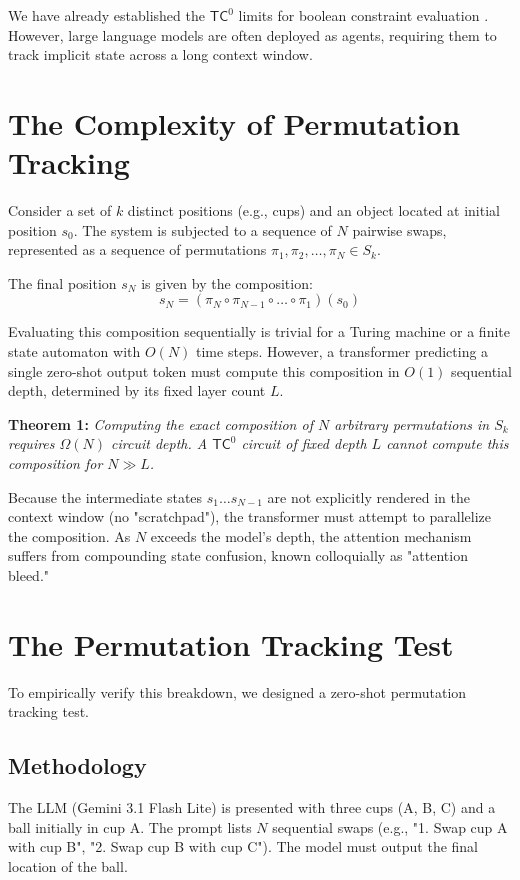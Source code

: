 \documentclass[12pt,a4paper]{article}
\begin{document}
We have already established the $\mathsf{TC}^0$ limits for boolean constraint evaluation \citep{aaronson2026_bounded}. However, large language models are often deployed as agents, requiring them to track implicit state across a long context window.

\section{The Complexity of Permutation Tracking}

Consider a set of $k$ distinct positions (e.g., cups) and an object located at initial position $s_0$. The system is subjected to a sequence of $N$ pairwise swaps, represented as a sequence of permutations $\pi_1, \pi_2, \dots, \pi_N \in S_k$.

The final position $s_N$ is given by the composition:
\begin{equation}
s_N = (\pi_N \circ \pi_{N-1} \circ \dots \circ \pi_1)(s_0)
\end{equation}

Evaluating this composition sequentially is trivial for a Turing machine or a finite state automaton with $O(N)$ time steps. However, a transformer predicting a single zero-shot output token must compute this composition in $O(1)$ sequential depth, determined by its fixed layer count $L$.

\textbf{Theorem 1:} \textit{Computing the exact composition of $N$ arbitrary permutations in $S_k$ requires $\Omega(N)$ circuit depth. A $\mathsf{TC}^0$ circuit of fixed depth $L$ cannot compute this composition for $N \gg L$.}

Because the intermediate states $s_1 \dots s_{N-1}$ are not explicitly rendered in the context window (no "scratchpad"), the transformer must attempt to parallelize the composition. As $N$ exceeds the model's depth, the attention mechanism suffers from compounding state confusion, known colloquially as "attention bleed."

\section{The Permutation Tracking Test}

To empirically verify this breakdown, we designed a zero-shot permutation tracking test.

\subsection{Methodology}
The LLM (Gemini 3.1 Flash Lite) is presented with three cups (A, B, C) and a ball initially in cup A. The prompt lists $N$ sequential swaps (e.g., "1. Swap cup A with cup B", "2. Swap cup B with cup C"). The model must output the final location of the ball.
\end{document}
